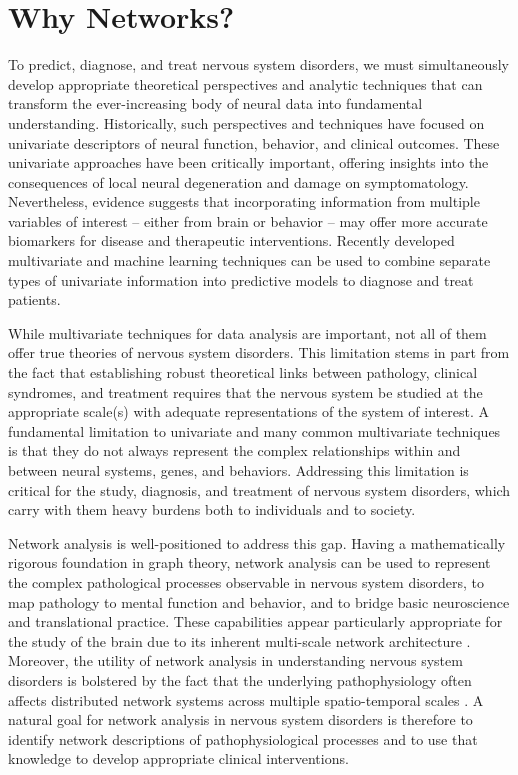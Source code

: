 \documentclass[12pt]{article}
\begin{document}
\section*{Why Networks?}

To predict, diagnose, and treat nervous system disorders, we must simultaneously develop appropriate theoretical perspectives and analytic techniques that can transform the ever-increasing body of neural data into fundamental understanding. Historically, such perspectives and techniques have focused on univariate descriptors of neural function, behavior, and clinical outcomes. These univariate approaches have been critically important, offering insights into the consequences of local neural degeneration and damage on symptomatology. Nevertheless, evidence suggests that incorporating information from multiple variables of interest -- either from brain or behavior -- may offer more accurate biomarkers for disease and therapeutic interventions. Recently developed multivariate and machine learning techniques can be used to combine separate types of univariate information into predictive models to diagnose and treat patients. 

While multivariate techniques for data analysis are important, not all of them offer true theories of nervous system disorders. This limitation stems in part from the fact that establishing robust theoretical links between pathology, clinical syndromes, and treatment requires that the nervous system be studied at the appropriate scale(s) with adequate representations of the system of interest. A fundamental limitation to univariate and many common multivariate techniques is that they do not always represent the complex relationships within and between neural systems, genes, and behaviors. Addressing this limitation is critical for the study, diagnosis, and treatment of nervous system disorders, which carry with them heavy burdens both to individuals and to society.

Network analysis is well-positioned to address this gap. Having a mathematically rigorous foundation in graph theory, network analysis can be used to represent the complex pathological processes observable in nervous system disorders, to map pathology to mental function and behavior, and to bridge basic neuroscience and translational practice. These capabilities appear particularly appropriate for the study of the brain due to its inherent multi-scale network architecture \cite{bassett2011understanding}. Moreover, the utility of network analysis in understanding nervous system disorders is bolstered by the fact that the underlying pathophysiology often affects distributed network systems across multiple spatio-temporal scales \cite{Stam2014}. A natural goal for network analysis in nervous system disorders is therefore to identify network descriptions of pathophysiological processes and to use that knowledge to develop appropriate clinical interventions. 
\end{document}
